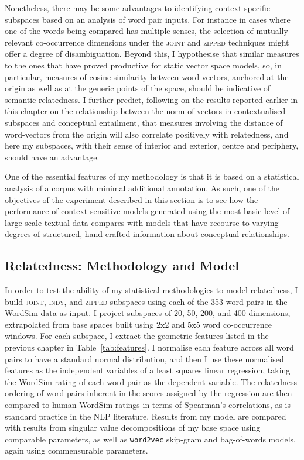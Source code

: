 Nonetheless, there may be some advantages to identifying context specific subspaces based on an analysis of word pair inputs.  For instance in cases where one of the words being compared has multiple senses, the selection of mutually relevant co-occurrence dimensions under the \textsc{joint} and \textsc{zipped} techniques might offer a degree of disambiguation.  Beyond this, I hypothesise that similar measures to the ones that have proved productive for static vector space models, so, in particular, measures of cosine similarity between word-vectors, anchored at the origin as well as at the generic points of the space, should be indicative of semantic relatedness.  I further predict, following on the results reported earlier in this chapter on the relationship between the norm of vectors in contextualised subspaces and conceptual entailment, that measures involving the distance of word-vectors from the origin will also correlate positively with relatedness, and here my subspaces, with their sense of interior and exterior, centre and periphery, should have an advantage.

One of the essential features of my methodology is that it is based on a statistical analysis of a corpus with minimal additional annotation.  As such, one of the objectives of the experiment described in this section is to see how the performance of context sensitive models generated using the most basic level of large-scale textual data compares with models that have recourse to varying degrees of structured, hand-crafted information about conceptual relationships.

\subsection{Relatedness: Methodology and Model}
In order to test the ability of my statistical methodologies to model relatedness, I build \textsc{joint}, \textsc{indy}, and \textsc{zipped} subspaces using each of the 353 word pairs in the WordSim data as input.  I project subspaces of 20, 50, 200, and 400 dimensions, extrapolated from base spaces built using 2x2 and 5x5 word co-occurrence windows.  For each subspace, I extract the geometric features listed in the previous chapter in Table~\ref{tab:features}.  I normalise each feature across all word pairs to have a standard normal distribution, and then I use these normalised features as the independent variables of a least squares linear regression, taking the WordSim rating of each word pair as the dependent variable.  The relatedness ordering of word pairs inherent in the scores assigned by the regression are then compared to human WordSim ratings in terms of Spearman's correlations, as is standard practice in the NLP literature.  Results from my model are compared with results from singular value decompositions of my base space using comparable parameters, as well as \texttt{word2vec} skip-gram and bag-of-words models, again using commensurable parameters.

